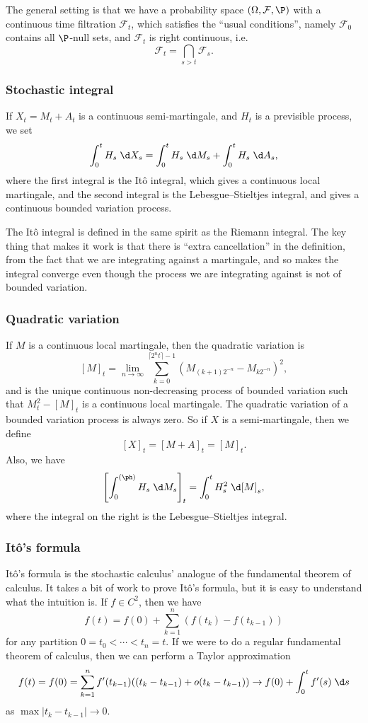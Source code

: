 \documentclass[a4paper]{article}
\begin{document}
The general setting is that we have a probability space $(\Omega, \mathcal{F}, \P)$ with a continuous time filtration $\mathcal{F}_t$, which satisfies the ``usual conditions'', namely $\mathcal{F}_0$ contains all $\P$-null sets, and $\mathcal{F}_t$ is right continuous, i.e.
\[
  \mathcal{F}_t = \bigcap_{s > t} \mathcal{F}_s.
\]
\subsubsection*{Stochastic integral}
If $X_t = M_t + A_t$ is a continuous semi-martingale, and $H_t$ is a previsible process, we set
\[
  \int_0^t H_s \;\d X_s = \int_0^t H_s \;\d M_s + \int_0^t H_s \;\d A_s,
\]
where the first integral is the It\^o integral, which gives a continuous local martingale, and the second integral is the Lebesgue--Stieltjes integral, and gives a continuous bounded variation process.

The It\^o integral is defined in the same spirit as the Riemann integral. The key thing that makes it work is that there is ``extra cancellation'' in the definition, from the fact that we are integrating against a martingale, and so makes the integral converge even though the process we are integrating against is not of bounded variation.
\subsubsection*{Quadratic variation}
If $M$ is a continuous local martingale, then the quadratic variation is
\[
  [M]_t = \lim_{n \to \infty} \sum_{k = 0}^{\lceil 2^n t\rceil - 1}(M_{(k + 1)2^{-n}} - M_{k2^{-n}})^2,
\]
and is the unique continuous non-decreasing process of bounded variation such that $M_t^2 - [M]_t$ is a continuous local martingale. The quadratic variation of a bounded variation process is always zero. So if $X$ is a semi-martingale, then we define
\[
  [X]_t = [M + A]_t = [M]_t.
\]
Also, we have
\[
  \left[\int_0^{(\ph)} H_s\;\d M_s\right]_t = \int_0^t H_s^2 \;\d [M]_s,
\]
where the integral on the right is the Lebesgue--Stieltjes integral.

\subsubsection*{It\^o's formula}
It\^o's formula is the stochastic calculus' analogue of the fundamental theorem of calculus. It takes a bit of work to prove It\^o's formula, but it is easy to understand what the intuition is. If $f \in C^2$, then we have
\[
  f(t) = f(0) + \sum_{k = 1}^n (f(t_k) - f(t_{k - 1}))
\]
for any partition $0 = t_0 < \cdots < t_n = t$. If we were to do a regular fundamental theorem of calculus, then we can perform a Taylor approximation
\[
  f(t) = f(0) = \sum_{k = 1}^n f'(t_{k - 1})((t_k - t_{k - 1}) + o(t_k - t_{k - 1})) \to f(0) + \int_0^t f'(s)\;\d s
\]
as $\max |t_k - t_{k - 1}| \to 0$.
\end{document}
